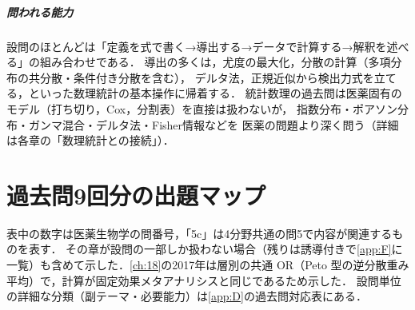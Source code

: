 \enlargethispage{4\baselineskip}
\paragraph{問われる能力}
設問のほとんどは「定義を式で書く→導出する→データで計算する→解釈を述べる」の組み合わせである．
導出の多くは，尤度の最大化，分散の計算（多項分布の共分散・条件付き分散を含む），
デルタ法，正規近似から検出力式を立てる，といった数理統計の基本操作に帰着する．
統計数理の過去問は医薬固有のモデル（打ち切り，Cox，分割表）を直接は扱わないが，
指数分布・ポアソン分布・ガンマ混合・デルタ法・Fisher情報などを
医薬の問題より深く問う（詳細は各章の「数理統計との接続」）．

\chapter*{過去問9回分の出題マップ}

表中の数字は医薬生物学の問番号，「5c」は4分野共通の問5で内容が関連するものを表す．
その章が設問の一部しか扱わない場合（残りは誘導付きで\cref{app:F}に一覧）も含めて示した．\cref{ch:18}の2017年は層別の共通 OR（Peto 型の逆分散重み平均）で，計算が固定効果メタアナリシスと同じであるため示した．
設問単位の詳細な分類（副テーマ・必要能力）は\cref{app:D}の過去問対応表にある．

